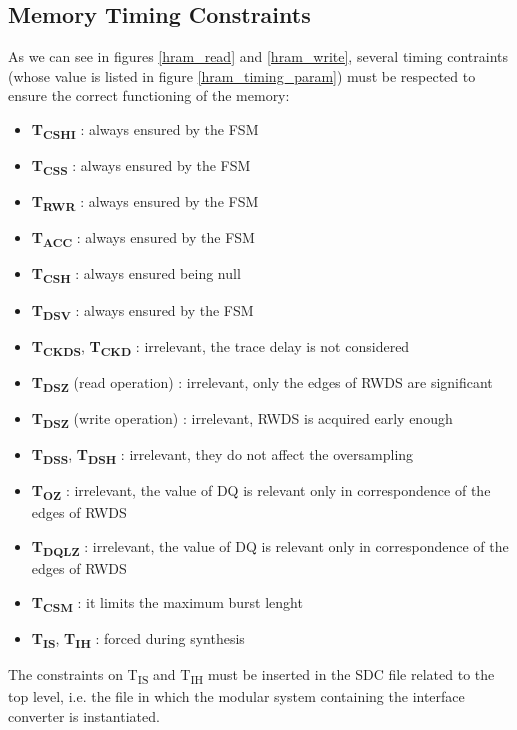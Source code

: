 \documentclass[10pt, english, a4paper, titlepage, oneside]{book}
\begin{document}
\subsection{Memory Timing Constraints} \label{timing_constraints}
\vspace{2mm}
As we can see in figures \ref{hram_read} and \ref{hram_write}, several timing contraints (whose value is listed in figure \ref{hram_timing_param}) must be respected to ensure the correct functioning of the memory:
\vspace{2mm}
\begin{itemize}
    \item \textbf{T\textsubscript{CSHI}} : always ensured by the FSM
    \item \textbf{T\textsubscript{CSS}} : always ensured by the FSM
    \item \textbf{T\textsubscript{RWR}} : always ensured by the FSM
    \item \textbf{T\textsubscript{ACC}} : always ensured by the FSM
    \item \textbf{T\textsubscript{CSH}} : always ensured being null
    \item \textbf{T\textsubscript{DSV}} : always ensured by the FSM
    \item \textbf{T\textsubscript{CKDS}}, \textbf{T\textsubscript{CKD}} : irrelevant, the trace delay is not considered
    \item \textbf{T\textsubscript{DSZ}} (read operation) : irrelevant, only the edges of RWDS are significant
    \item \textbf{T\textsubscript{DSZ}} (write operation) : irrelevant, RWDS is acquired early enough
    \item \textbf{T\textsubscript{DSS}}, \textbf{T\textsubscript{DSH}} : irrelevant, they do not affect the oversampling
    \item \textbf{T\textsubscript{OZ}} : irrelevant, the value of DQ is relevant only in correspondence of the edges of RWDS
    \item \textbf{T\textsubscript{DQLZ}} : irrelevant, the value of DQ is relevant only in correspondence of the edges of RWDS
    \item \textbf{T\textsubscript{CSM}} : it limits the maximum burst lenght
    \item \textbf{T\textsubscript{IS}}, \textbf{T\textsubscript{IH}} : forced during synthesis
\end{itemize}
\vspace{4mm}
The constraints on T\textsubscript{IS} and T\textsubscript{IH} must be inserted in the SDC file related to the top level, i.e. the file in which the modular system containing the interface converter is instantiated. 
\end{document}
